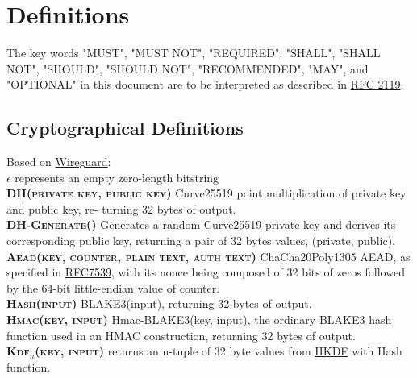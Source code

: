 \section{Definitions}

The key words "MUST", "MUST NOT", "REQUIRED", "SHALL", "SHALL NOT",
"SHOULD", "SHOULD NOT", "RECOMMENDED", "MAY", and "OPTIONAL" in this
document are to be interpreted as described in \href{https://datatracker.ietf.org/doc/html/rfc2119}{RFC 2119}.

\subsection{Cryptographical Definitions}

Based on \href{https://www.wireguard.com/papers/wireguard.pdf}{Wireguard}:\\


$\epsilon$ represents an empty zero-length bitstring\\
\textbf{\textsc{DH(private key, public key)}} Curve25519 point multiplication of private key and public key, re-
turning 32 bytes of output.\\
\textbf{\textsc{DH-Generate()} }Generates a random Curve25519 private key and derives its corresponding public key,
returning a pair of 32 bytes values, (private, public).\\
\textbf{\textsc{Aead(key, counter, plain text, auth text)}} ChaCha20Poly1305 AEAD, as specified in \href{https://www.rfc-editor.org/rfc/rfc7539}{RFC7539},
with its nonce being composed of 32 bits of zeros followed by the 64-bit little-endian value of counter.\\
\textbf{\textsc{Hash(input)}} BLAKE3(input), returning 32 bytes of output.\\
\textbf{\textsc{Hmac(key, input)}} Hmac-BLAKE3(key, input), the ordinary BLAKE3 hash function used in an
HMAC construction, returning 32 bytes of output.\\
\textbf{\textsc{Kdf$_n$(key, input)}} returns an n-tuple of 32 byte values from \href{https://eprint.iacr.org/2010/264.pdf}{HKDF} with Hash function.